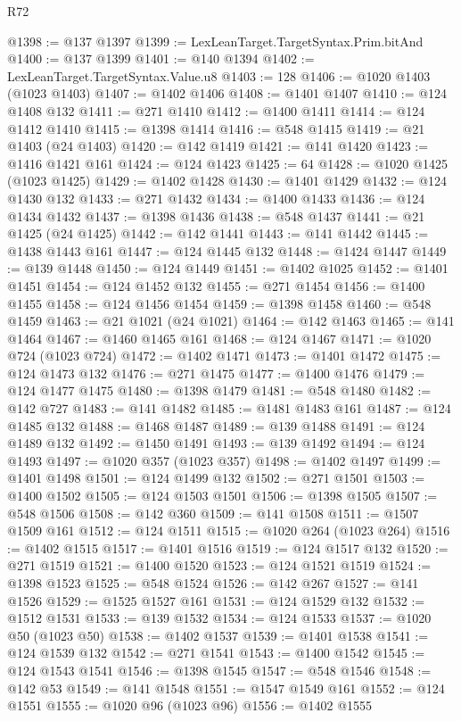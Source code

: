 \begin{lexlean}{R72}
\begin{coremodule}
@1398 := @137 @1397
@1399 := LexLeanTarget.TargetSyntax.Prim.bitAnd
@1400 := @137 @1399
@1401 := @140 @1394
@1402 := LexLeanTarget.TargetSyntax.Value.u8
@1403 := 128
@1406 := @1020 @1403 (@1023 @1403)
@1407 := @1402 @1406
@1408 := @1401 @1407
@1410 := @124 @1408 @132
@1411 := @271 @1410
@1412 := @1400 @1411
@1414 := @124 @1412 @1410
@1415 := @1398 @1414
@1416 := @548 @1415
@1419 := @21 @1403 (@24 @1403)
@1420 := @142 @1419
@1421 := @141 @1420
@1423 := @1416 @1421 @161
@1424 := @124 @1423
@1425 := 64
@1428 := @1020 @1425 (@1023 @1425)
@1429 := @1402 @1428
@1430 := @1401 @1429
@1432 := @124 @1430 @132
@1433 := @271 @1432
@1434 := @1400 @1433
@1436 := @124 @1434 @1432
@1437 := @1398 @1436
@1438 := @548 @1437
@1441 := @21 @1425 (@24 @1425)
@1442 := @142 @1441
@1443 := @141 @1442
@1445 := @1438 @1443 @161
@1447 := @124 @1445 @132
@1448 := @1424 @1447
@1449 := @139 @1448
@1450 := @124 @1449
@1451 := @1402 @1025
@1452 := @1401 @1451
@1454 := @124 @1452 @132
@1455 := @271 @1454
@1456 := @1400 @1455
@1458 := @124 @1456 @1454
@1459 := @1398 @1458
@1460 := @548 @1459
@1463 := @21 @1021 (@24 @1021)
@1464 := @142 @1463
@1465 := @141 @1464
@1467 := @1460 @1465 @161
@1468 := @124 @1467
@1471 := @1020 @724 (@1023 @724)
@1472 := @1402 @1471
@1473 := @1401 @1472
@1475 := @124 @1473 @132
@1476 := @271 @1475
@1477 := @1400 @1476
@1479 := @124 @1477 @1475
@1480 := @1398 @1479
@1481 := @548 @1480
@1482 := @142 @727
@1483 := @141 @1482
@1485 := @1481 @1483 @161
@1487 := @124 @1485 @132
@1488 := @1468 @1487
@1489 := @139 @1488
@1491 := @124 @1489 @132
@1492 := @1450 @1491
@1493 := @139 @1492
@1494 := @124 @1493
@1497 := @1020 @357 (@1023 @357)
@1498 := @1402 @1497
@1499 := @1401 @1498
@1501 := @124 @1499 @132
@1502 := @271 @1501
@1503 := @1400 @1502
@1505 := @124 @1503 @1501
@1506 := @1398 @1505
@1507 := @548 @1506
@1508 := @142 @360
@1509 := @141 @1508
@1511 := @1507 @1509 @161
@1512 := @124 @1511
@1515 := @1020 @264 (@1023 @264)
@1516 := @1402 @1515
@1517 := @1401 @1516
@1519 := @124 @1517 @132
@1520 := @271 @1519
@1521 := @1400 @1520
@1523 := @124 @1521 @1519
@1524 := @1398 @1523
@1525 := @548 @1524
@1526 := @142 @267
@1527 := @141 @1526
@1529 := @1525 @1527 @161
@1531 := @124 @1529 @132
@1532 := @1512 @1531
@1533 := @139 @1532
@1534 := @124 @1533
@1537 := @1020 @50 (@1023 @50)
@1538 := @1402 @1537
@1539 := @1401 @1538
@1541 := @124 @1539 @132
@1542 := @271 @1541
@1543 := @1400 @1542
@1545 := @124 @1543 @1541
@1546 := @1398 @1545
@1547 := @548 @1546
@1548 := @142 @53
@1549 := @141 @1548
@1551 := @1547 @1549 @161
@1552 := @124 @1551
@1555 := @1020 @96 (@1023 @96)
@1556 := @1402 @1555

\end{coremodule}
\end{lexlean}
